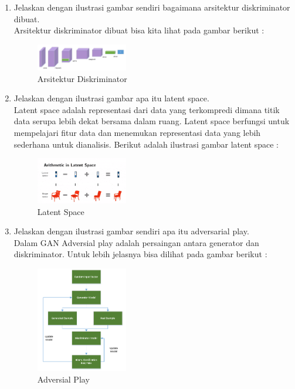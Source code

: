 \begin{enumerate}
\item Jelaskan dengan ilustrasi gambar sendiri bagaimana arsitektur diskriminator dibuat.\\
Arsitektur diskriminator dibuat bisa kita lihat pada gambar berikut :
\begin{figure}[H]
	\includegraphics[width=4cm]{figures/1174054/8/4.png}
	\centering
	\caption{Arsitektur Diskriminator}
\end{figure}

\item Jelaskan dengan ilustrasi gambar apa itu latent space.\\
Latent space adalah representasi dari data yang terkompredi dimana titik data serupa lebih dekat bersama dalam ruang. Latent space berfungsi untuk mempelajari fitur data dan menemukan representasi data yang lebih sederhana untuk dianalisis.
Berikut adalah ilustrasi gambar latent space :
\begin{figure}[H]
	\includegraphics[width=4cm]{figures/1174054/8/5.png}
	\centering
	\caption{Latent Space}
\end{figure}

\item Jelaskan dengan ilustrasi gambar sendiri apa itu adversarial play.\\
Dalam GAN Adversial play adalah persaingan antara generator dan diskriminator. Untuk lebih jelasnya bisa dilihat pada gambar berikut :
\begin{figure}[H]
	\includegraphics[width=4cm]{figures/1174054/8/6.png}
	\centering
	\caption{Adversial Play}
\end{figure}


\end{enumerate}
